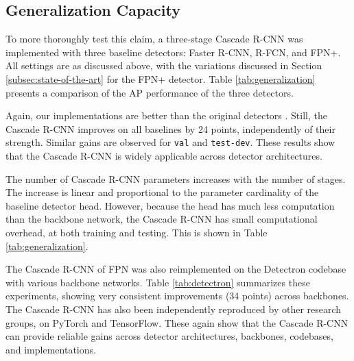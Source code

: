 \documentclass[10pt,journal,compsoc]{IEEEtran}
\begin{document}
\subsection{Generalization Capacity}

To more thoroughly test this claim, a three-stage Cascade R-CNN
was implemented with three baseline detectors: Faster R-CNN,
R-FCN, and FPN+. All settings are as discussed above,
with the variations discussed in Section \ref{subsec:state-of-the-art} for
the FPN+ detector. Table \ref{tab:generalization} presents a comparison
of the AP performance of the three detectors.

\vspace{0.2cm}
Again, our implementations are better than the original
detectors \cite{DBLP:conf/nips/RenHGS15,DBLP:conf/nips/DaiLHS16,
lin2017feature}. Still, the Cascade R-CNN improves on all baselines
by 24 points, independently of their strength.
Similar gains are observed for \texttt{val} and \texttt{test-dev}. These
results show that the Cascade R-CNN is widely applicable across
detector architectures.

\vspace{0.2cm}
The number of Cascade R-CNN parameters increases with the number of
stages. The increase is linear and proportional
to the parameter cardinality of the baseline detector head.
However, because the head has much less computation than the backbone
network, the Cascade R-CNN has
small computational overhead, at both training and testing.
This is shown in Table \ref{tab:generalization}.

\vspace{0.2cm}
The Cascade R-CNN of FPN was also reimplemented on the Detectron
codebase \cite{Detectron2018} with various backbone networks.
Table \ref{tab:detectron} summarizes these experiments, showing very
consistent improvements (34 points) across backbones.
The Cascade R-CNN has also been independently reproduced by other research
groups, on PyTorch and TensorFlow. These again
show that the Cascade R-CNN can provide reliable gains
across detector architectures, backbones, codebases, and implementations.
\end{document}

